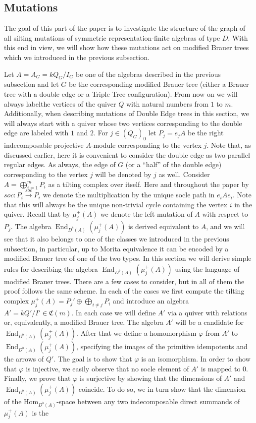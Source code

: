 \documentclass[12pt]{amsart}
\theoremstyle{plain}
\theoremstyle{remark}
\theoremstyle{definition}
\newcommand{\End}{\mathop{\mathrm{End}}\nolimits}
\newcommand{\Hom}{{\mathrm{Hom}}}
\begin{document}
\subsection{Mutations}

The goal of this part of the paper is to investigate the structure of the graph of all silting mutations of symmetric representation-finite algebras of type $D$. With this end in view, we will show how these mutations act on modified Brauer trees which we introduced in the previous subsection. 

Let $A = A_G = kQ_G/I_G$ be one of the algebras described in the previous subsection and let $G$ be the corresponding modified Brauer tree (either a Brauer tree with a double edge or a Triple Tree configuration). From now on we will always labelthe vertices of the quiver $Q$ with natural numbers from $1$ to $m$. Additionally, when describing mutations of Double Edge trees in this section, we will always start with a quiver whose two vertices corresponding to the double edge are labeled with $1$ and $2$. For $j \in (Q_G)_0$ let $P_j = e_jA$ be the right indecomposable projective $A$-module corresponding to the vertex $j$. Note that, as discussed earlier, here it is convenient to consider the double edge as two parallel regular edges. As always, the edge of $G$ (or a ``half'' of the double edge) corresponding to the vertex $j$ will be denoted by $j$ as well. Consider $A = \bigoplus_{i=1}^m P_i$ as a tilting complex over itself. Here and throughout the paper by $soc \colon P_i \xrightarrow{soc} P_i$ we denote the multiplication by the unique socle path in $e_iAe_i$. Note that this will always be the unique non-trivial cycle containing the vertex $i$ in the quiver. Recall that by $\mu_j^+(A)$ we denote the left mutation of $A$ with respect to $P_j$. The algebra $\End_{D^b(A)}(\mu_j^+(A))$ is derived equivalent to $A$, and we will see that it also belongs to one of the classes we introduced in the previous subsection, in particular, up to Morita equivalence it can be encoded by a modified Brauer tree of one of the two types. In this section we will derive simple rules for describing the algebra $\End_{D^b(A)}(\mu_j^+(A))$ using the language of modified Brauer trees. There are a few cases to consider, but in all of them the proof follows the same scheme. In each of the cases we first compute the tilting complex $\mu_j^+(A) = P_j' \oplus \bigoplus_{i\neq j} P_i$ and introduce an algebra $A' = kQ'/{I'} \in \mathfrak{C}(m)$. In each case we will define $A'$ via a quiver with relations or, equivalently, a modified Brauer tree. The algebra $A'$ will be a candidate for $\End_{D^b(A)}(\mu_j^+(A))$. After that we define a homomorphism $\varphi$ from $A'$ to $\End_{D^b(A)}(\mu_j^+(A))$, specifying the images of the primitive idempotents and the arrows of $Q'$. The goal is to show that $\varphi$ is an isomorphism. In order to show that $\varphi$ is injective, we easily observe that no socle element of $A'$ is mapped to $0$. Finally, we prove that $\varphi$ is surjective by showing that the dimensions of $A'$ and $\End_{D^b(A)}(\mu_j^+(A))$ coincide. To do so, we in turn show that the dimension of the $\Hom_{D^b(A)}$-space between any two indecomposable direct summands of $\mu_j^+(A)$ is the 
\end{document}
